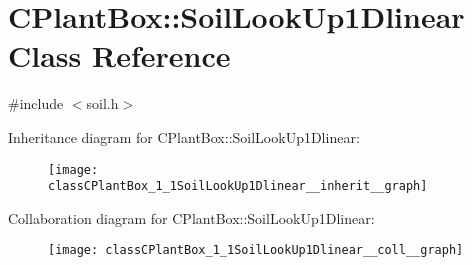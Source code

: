 \hypertarget{classCPlantBox_1_1SoilLookUp1Dlinear}{}\section{C\+Plant\+Box\+:\+:Soil\+Look\+Up1\+Dlinear Class Reference}
\label{classCPlantBox_1_1SoilLookUp1Dlinear}


{\ttfamily \#include $<$soil.\+h$>$}



Inheritance diagram for C\+Plant\+Box\+:\+:Soil\+Look\+Up1\+Dlinear\+:\nopagebreak
\begin{figure}[H]
\begin{center}
\leavevmode
\texttt{[image: classCPlantBox\_1\_1SoilLookUp1Dlinear\_\_inherit\_\_graph]}
\end{center}
\end{figure}


Collaboration diagram for C\+Plant\+Box\+:\+:Soil\+Look\+Up1\+Dlinear\+:\nopagebreak
\begin{figure}[H]
\begin{center}
\leavevmode
\texttt{[image: classCPlantBox\_1\_1SoilLookUp1Dlinear\_\_coll\_\_graph]}
\end{center}
\end{figure}
